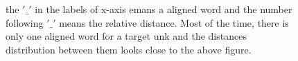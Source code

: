 \documentclass{article}
\begin{document}
\begin{itemize}
\begin{figure}[H]
\label{fig:dicesetdoc_grammar}
\caption{the $'\_'$ in the labels of x-axis emans a aligned word and the number following $'\_'$ means the relative distance. Most of the time, there is only one aligned word for a target unk and the distances distribution between them looks close to the above figure.}
\end{figure}
\end{itemize}
\end{document}
